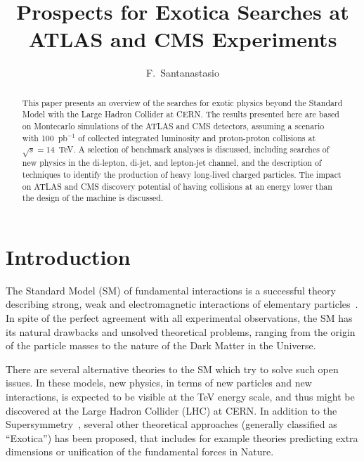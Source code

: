 \documentclass{cimento}
\title{Prospects for Exotica Searches at ATLAS and CMS Experiments}
\author{F.~Santanastasio\from{ins:UMD}\ETC
}
\begin{document}
\maketitle

\begin{abstract}
This paper presents an overview of the searches for exotic physics 
beyond the Standard Model with the Large Hadron Collider at CERN. 
The results presented here are based on Montecarlo simulations of the
ATLAS and CMS detectors, assuming a scenario with 
100~pb$^{-1}$ of collected integrated luminosity and proton-proton collisions 
at $\sqrt{s} = 14$~TeV. A selection of benchmark analyses is discussed, 
including searches of new physics in the di-lepton, di-jet, and lepton-jet channel, 
and the description of techniques to identify the production of 
heavy long-lived charged particles. 
The impact on ATLAS and CMS discovery potential 
of having collisions at an energy lower than the design of the machine 
is discussed.
\end{abstract}

\section{Introduction}
The Standard Model (SM) of fundamental interactions is a successful theory 
describing strong, weak and electromagnetic interactions of elementary 
particles~\cite{PhysRevLett.19.1264}. 
In spite of the perfect agreement with all experimental 
observations, the SM has its natural drawbacks and unsolved theoretical 
problems, ranging from the origin of the particle masses to the nature of the 
Dark Matter in the Universe.

There are several alternative theories to the SM which try to solve such 
open issues. In these models, new physics, in terms of new particles and 
new interactions, is expected to be visible at the TeV energy scale, and 
thus might be discovered at the Large Hadron Collider (LHC) at CERN.
In addition to the Supersymmetry~\cite{Martin:1997ns}, 
several other theoretical approaches 
(generally classified as ``Exotica'') has been proposed, 
that includes for example theories predicting extra dimensions or 
unification of the fundamental forces in Nature.
\end{document}
